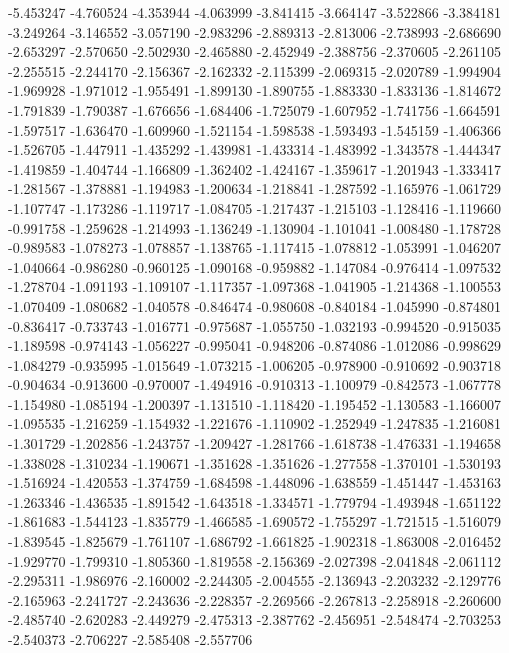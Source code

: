 -5.453247
-4.760524
-4.353944
-4.063999
-3.841415
-3.664147
-3.522866
-3.384181
-3.249264
-3.146552
-3.057190
-2.983296
-2.889313
-2.813006
-2.738993
-2.686690
-2.653297
-2.570650
-2.502930
-2.465880
-2.452949
-2.388756
-2.370605
-2.261105
-2.255515
-2.244170
-2.156367
-2.162332
-2.115399
-2.069315
-2.020789
-1.994904
-1.969928
-1.971012
-1.955491
-1.899130
-1.890755
-1.883330
-1.833136
-1.814672
-1.791839
-1.790387
-1.676656
-1.684406
-1.725079
-1.607952
-1.741756
-1.664591
-1.597517
-1.636470
-1.609960
-1.521154
-1.598538
-1.593493
-1.545159
-1.406366
-1.526705
-1.447911
-1.435292
-1.439981
-1.433314
-1.483992
-1.343578
-1.444347
-1.419859
-1.404744
-1.166809
-1.362402
-1.424167
-1.359617
-1.201943
-1.333417
-1.281567
-1.378881
-1.194983
-1.200634
-1.218841
-1.287592
-1.165976
-1.061729
-1.107747
-1.173286
-1.119717
-1.084705
-1.217437
-1.215103
-1.128416
-1.119660
-0.991758
-1.259628
-1.214993
-1.136249
-1.130904
-1.101041
-1.008480
-1.178728
-0.989583
-1.078273
-1.078857
-1.138765
-1.117415
-1.078812
-1.053991
-1.046207
-1.040664
-0.986280
-0.960125
-1.090168
-0.959882
-1.147084
-0.976414
-1.097532
-1.278704
-1.091193
-1.109107
-1.117357
-1.097368
-1.041905
-1.214368
-1.100553
-1.070409
-1.080682
-1.040578
-0.846474
-0.980608
-0.840184
-1.045990
-0.874801
-0.836417
-0.733743
-1.016771
-0.975687
-1.055750
-1.032193
-0.994520
-0.915035
-1.189598
-0.974143
-1.056227
-0.995041
-0.948206
-0.874086
-1.012086
-0.998629
-1.084279
-0.935995
-1.015649
-1.073215
-1.006205
-0.978900
-0.910692
-0.903718
-0.904634
-0.913600
-0.970007
-1.494916
-0.910313
-1.100979
-0.842573
-1.067778
-1.154980
-1.085194
-1.200397
-1.131510
-1.118420
-1.195452
-1.130583
-1.166007
-1.095535
-1.216259
-1.154932
-1.221676
-1.110902
-1.252949
-1.247835
-1.216081
-1.301729
-1.202856
-1.243757
-1.209427
-1.281766
-1.618738
-1.476331
-1.194658
-1.338028
-1.310234
-1.190671
-1.351628
-1.351626
-1.277558
-1.370101
-1.530193
-1.516924
-1.420553
-1.374759
-1.684598
-1.448096
-1.638559
-1.451447
-1.453163
-1.263346
-1.436535
-1.891542
-1.643518
-1.334571
-1.779794
-1.493948
-1.651122
-1.861683
-1.544123
-1.835779
-1.466585
-1.690572
-1.755297
-1.721515
-1.516079
-1.839545
-1.825679
-1.761107
-1.686792
-1.661825
-1.902318
-1.863008
-2.016452
-1.929770
-1.799310
-1.805360
-1.819558
-2.156369
-2.027398
-2.041848
-2.061112
-2.295311
-1.986976
-2.160002
-2.244305
-2.004555
-2.136943
-2.203232
-2.129776
-2.165963
-2.241727
-2.243636
-2.228357
-2.269566
-2.267813
-2.258918
-2.260600
-2.485740
-2.620283
-2.449279
-2.475313
-2.387762
-2.456951
-2.548474
-2.703253
-2.540373
-2.706227
-2.585408
-2.557706
